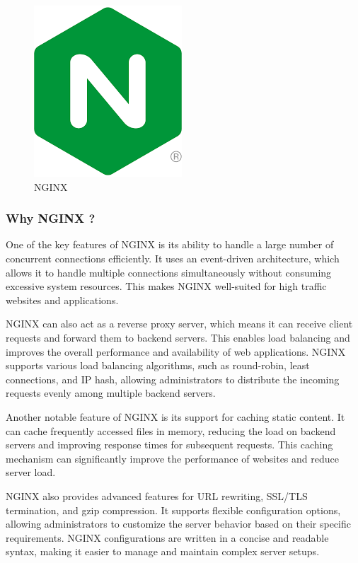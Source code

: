 \documentclass[
12pt,
oneside, 
onehalfspacing, 
nolistspacing, 
parskip, 
chapterinoneline, 
]{AASTCOMPUTER}
\begin{document}
\begin{figure}[!ht]
	\centering
	\includegraphics[scale=0.5]{Figures/Backend/nginx.png}
  	\caption{NGINX}
  	\label{fig:NGINX}
\end{figure}

\subsubsection{Why NGINX ?}
One of the key features of NGINX is its ability to handle a large number of concurrent connections efficiently. It uses an event-driven architecture, which allows it to handle multiple connections simultaneously without consuming excessive system resources. This makes NGINX well-suited for high traffic websites and applications.

NGINX can also act as a reverse proxy server, which means it can receive client requests and forward them to backend servers. This enables load balancing and improves the overall performance and availability of web applications. NGINX supports various load balancing algorithms, such as round-robin, least connections, and IP hash, allowing administrators to distribute the incoming requests evenly among multiple backend servers.

Another notable feature of NGINX is its support for caching static content. It can cache frequently accessed files in memory, reducing the load on backend servers and improving response times for subsequent requests. This caching mechanism can significantly improve the performance of websites and reduce server load.

NGINX also provides advanced features for URL rewriting, SSL/TLS termination, and gzip compression. It supports flexible configuration options, allowing administrators to customize the server behavior based on their specific requirements. NGINX configurations are written in a concise and readable syntax, making it easier to manage and maintain complex server setups.
\end{document}

